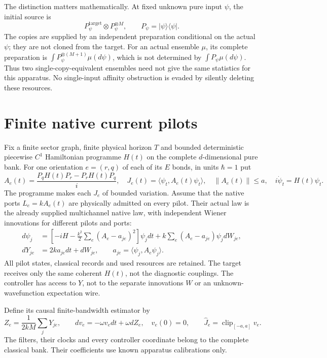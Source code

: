 \documentclass[11pt,oneside,openany]{book}
\theoremstyle{definition}
\theoremstyle{remark}\newtheorem{remark}[theorem]{Remark}
\begin{document}
The distinction matters mathematically. At fixed unknown pure input
$\psi$, the initial source is
\begin{equation}
 P_\psi^{\mathrm{target}}\otimes P_\psi^{\otimes M},
 \qquad P_\psi=|\psi\rangle\langle\psi|.       \label{copy:input}
\end{equation}
The copies are supplied by an independent preparation conditional on
the actual $\psi$; they are not cloned from the target. For an actual
ensemble $\mu$, its complete preparation is
$\int P_\psi^{\otimes(M+1)}\mu(d\psi)$, which is not determined by
$\int P_\psi\mu(d\psi)$. Thus two single-copy-equivalent ensembles
need not give the same statistics for this apparatus. No single-input
affinity obstruction is evaded by silently deleting these resources.

\section{Finite native current pilots}

Fix a finite sector graph, finite physical horizon $T$ and bounded
deterministic piecewise $C^1$ Hamiltonian programme $H(t)$ on the
complete $d$-dimensional pure bank. For one orientation $e=(r,q)$ of
each of its $E$ bonds, in units $\hbar=1$ put
\begin{equation}
 A_e(t)=\frac{P_qH(t)P_r-P_rH(t)P_q}{i},\quad
 J_e(t)=\langle\psi_t,A_e(t)\psi_t\rangle,
 \quad\|A_e(t)\|\le a,\quad i\dot\psi_t=H(t)\psi_t.        \label{copy:current}
\end{equation}
The programme makes each $J_e$ of bounded variation. Assume that the
native ports $L_e=kA_e(t)$ are physically admitted on every pilot.
Their actual law is the already supplied multichannel native law,
with independent Wiener innovations for different pilots and ports:
\begin{align}
 d\psi_j&=\left[-iH-\frac{k^2}{2}\sum_e(A_e-a_{je})^2\right]
                 \psi_jdt+k\sum_e(A_e-a_{je})\psi_jdW_{je},\nonumber\\
 dY_{je}&=2ka_{je}dt+dW_{je},\qquad
 a_{je}=\langle\psi_j,A_e\psi_j\rangle.          \label{copy:pilots}
\end{align}
All pilot states, classical records and used resources are retained.
The target receives only the same coherent $H(t)$, not the diagnostic
couplings. The controller has access to $Y$, not to the separate
innovations $W$ or an unknown-wavefunction expectation wire.

Define its causal finite-bandwidth estimator by
\begin{equation}
 Z_e=\frac1{2kM}\sum_jY_{je},\qquad
 dv_e=-\omega v_e dt+\omega dZ_e,\quad  v_e(0)=0,
 \qquad\widehat J_e=\operatorname{clip}_{[-a,a]}v_e.          \label{copy:estimator}
\end{equation}
The filters, their clocks and every controller coordinate belong to
the complete classical bank. Their coefficients use known apparatus
calibrations only.
\end{document}
